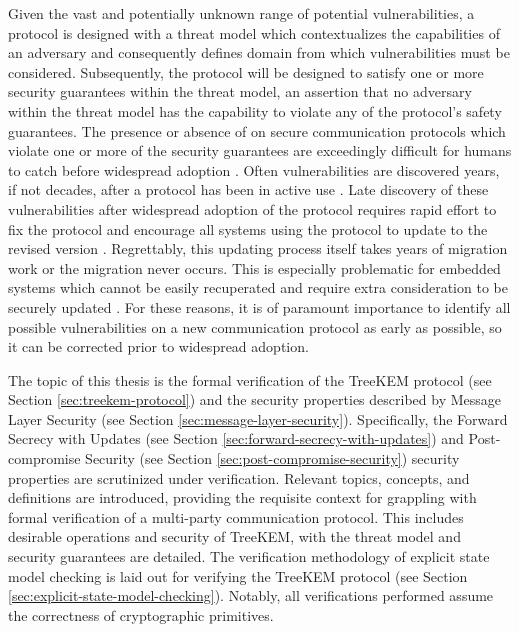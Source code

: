 Given the vast and potentially unknown range of potential vulnerabilities, a protocol is designed with a threat model \autocite{salter1998toward} which contextualizes the capabilities of an adversary and consequently defines domain from which vulnerabilities must be considered.
Subsequently, the protocol will be designed to satisfy one or more security guarantees \autocite{rfc3552} within the threat model, an assertion that no adversary within the threat model has the capability to violate any of the protocol's safety guarantees.
The presence or absence of  on secure communication protocols which violate one or more of the security guarantees are exceedingly difficult for humans to catch before widespread adoption \autocite{clark1997survey}.
Often vulnerabilities are discovered years, if not decades, after a protocol has been in active use \autocite{CERVESATO2008402, durumeric2014matter}.
Late discovery of these vulnerabilities after widespread adoption of the protocol requires rapid effort to fix the protocol and encourage all systems using the protocol to update to the revised version \autocite{ghafoor2014analysis}.
Regrettably, this updating process itself takes years of migration work \autocite{markowsky2015scanning} or the migration never occurs.
This is especially problematic for embedded systems which cannot be easily recuperated and require extra consideration to be securely updated \autocite{yoon2017remote, maroof2022irecover}.
For these reasons, it is of paramount importance to identify all possible vulnerabilities on a new communication protocol as early as possible, so it can be corrected prior to widespread adoption.

The topic of this thesis is the formal verification of the TreeKEM protocol (see Section \ref{sec:treekem-protocol}) and the security properties described by Message Layer Security (see Section \ref{sec:message-layer-security}).
Specifically, the Forward Secrecy with Updates (see Section \ref{sec:forward-secrecy-with-updates}) and Post-compromise Security (see Section \ref{sec:post-compromise-security}) security properties are scrutinized under verification.
Relevant topics, concepts, and definitions are introduced, providing the requisite context for grappling with formal verification of a multi-party communication protocol.
This includes desirable operations and security of TreeKEM, with the threat model and security guarantees are detailed.
The verification methodology of explicit state model checking is laid out for verifying the TreeKEM protocol (see Section \ref{sec:explicit-state-model-checking}).
Notably, all verifications performed assume the correctness of cryptographic primitives.

